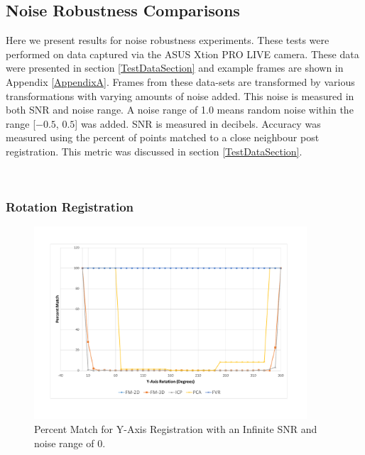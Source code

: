 
\subsection{Noise Robustness Comparisons}


Here we present results for noise robustness experiments. These tests were performed on data captured via the ASUS Xtion PRO LIVE camera. These data were presented in section \ref{TestDataSection} and example frames are shown in Appendix \ref{AppendixA}. Frames from these data-sets are transformed by various transformations with varying amounts of noise added. This noise is measured in both SNR and noise range. A noise range of 1.0 means random noise within the range [$-0.5$, $0.5$] was added. SNR is measured in decibels. Accuracy was measured using the percent of points matched to a close neighbour post registration. This metric was discussed in section \ref{TestDataSection}. 



\begin{table}[!htb]
\centering
{}
\\
\caption{Average percent matched registration results for data rotated about the y-axis under varying noise conditions.}
\label{table:YRNoiseT}
\end{table}


\subsubsection{Rotation Registration}

\begin{figure}[!htb]
\centering
\includegraphics[width=4.0in]{images/results/noise/YRNoise0}
\caption{Percent Match for Y-Axis Registration with an Infinite SNR and noise range of $0$.}
\label{fig:YRNoise0}
\end{figure}

